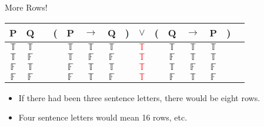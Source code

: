 \documentclass[
  ignorenonframetext,
]{beamer}
\providecommand{\tightlist}{%
  \setlength{\itemsep}{0pt}\setlength{\parskip}{0pt}}
\renewcommand{\,}{\text{, }}
\def\True{\mathbb{T}}
\def\False{\mathbb{F}}
\begin{document}
\begin{frame}{More Rows!}
\protect\hypertarget{more-rows}{}
\begin{center}
\begin{tabular}{@{ }c@{ }@{ }c | c@{ }@{}c@{}@{ }c@{ }@{ }c@{ }@{ }c@{ }@{}c@{}@{ }c@{ }@{}c@{}@{ }c@{ }@{ }c@{ }@{ }c@{ }@{}c@{}@{ }c}
P & Q &  & ( & P & $\rightarrow$ & Q & ) & $\lor$ & ( & Q & $\rightarrow$ & P & ) & \\
\hline 
$\True$ & $\True$ &  &  & $\True$ & $\True$ & $\True$ &  & \textcolor{red}{$\True$} &  & $\True$ & $\True$ & $\True$ &  & \\
$\True$ & $\False$ &  &  & $\True$ & $\False$ & $\False$ &  & \textcolor{red}{$\True$} &  & $\False$ & $\True$ & $\True$ &  & \\
$\False$ & $\True$ &  &  & $\False$ & $\True$ & $\True$ &  & \textcolor{red}{$\True$} &  & $\True$ & $\False$ & $\False$ &  & \\
$\False$ & $\False$ &  &  & $\False$ & $\True$ & $\False$ &  & \textcolor{red}{$\True$} &  & $\False$ & $\True$ & $\False$ &  & \\
\end{tabular}

\end{center}

\begin{itemize}
\tightlist
\item
  If there had been three sentence letters, there would be eight rows.
\item
  Four sentence letters would mean 16 rows, etc.
\end{itemize}
\end{frame}
\end{document}
